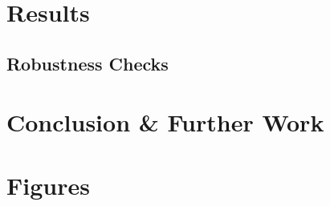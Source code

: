 \documentclass[11pt, oneside]{article}
\begin{document}
	\section{Results}
	
	\label{results}
	
	\subsection{Robustness Checks}
	
	\label{robustness}
	
	\section{Conclusion \& Further Work}
	
	\label{conclusion}
	\newpage
	
	
	
	
	\newpage
	
	\section*{Figures}
	
	\newpage
	
\end{document}
